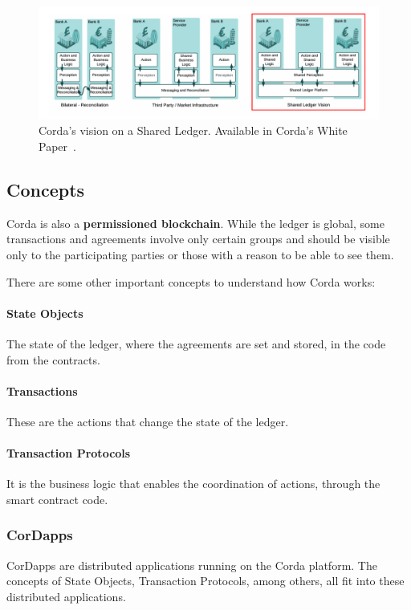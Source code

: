 \begin{figure}[h]
\centering
\includegraphics[scale=0.16]{media/corda_shared_ledger.png}
\caption[Corda's vision on a Shared Ledger]{Corda's vision on a Shared Ledger. Available in Corda's White Paper~\cite{Brown2016}.}
\label{fig:shared_ledger}
\end{figure}

\subsection{Concepts}
Corda is also a \textbf{permissioned blockchain}. While the ledger is global, some transactions and agreements involve only certain groups and should be visible only to the participating parties or those with a reason to be able to see them. 

There are some other important concepts to understand how Corda works:
\paragraph{State Objects} The state of the ledger, where the agreements are set and stored, in the code from the contracts.
\paragraph{Transactions} These are the actions that change the state of the ledger.
\paragraph{Transaction Protocols} It is the business logic that enables the coordination of actions, through the smart contract code.


\subsubsection{CorDapps}
CorDapps are distributed applications running on the Corda platform. The concepts of State Objects, Transaction Protocols, among others, all fit into these distributed applications.

